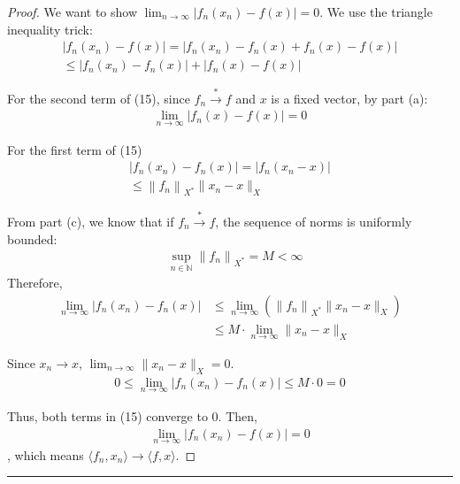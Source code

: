 \documentclass{article}
\newcommand{\norm}[1]{\left\|#1\right\|}
\begin{document}
\begin{proof}
    We want to show $\lim_{n \to \infty} |f_n(x_n) - f(x)| = 0$. We use the triangle inequality trick:
    \begin{align}
    |f_n(x_n) - f(x)| 
    = |f_n(x_n) - f_n(x) + f_n(x) - f(x)|
    \\
    \le |f_n(x_n) - f_n(x)| + |f_n(x) - f(x)|
    \end{align}

    For the second term of (15), since $f_{n} \xrightarrow{*} f$ and $x$ is a fixed vector, by part (a):
    \begin{align}
        \lim_{n \to \infty} |f_n(x) - f(x)| = 0
    \end{align}

    For the first term of (15)
    \begin{align}
        |f_n(x_n) - f_n(x)| 
        = |f_n(x_n - x)|
        \\
        \le \norm{f_n}_{X^{*}} \|x_n - x\|_X
    \end{align}
    
    From part (c), we know that if $f_{n} \xrightarrow{*} f$, the sequence of norms is uniformly bounded:
    \begin{align}
        &\sup_{n \in \mathbb{N}} \norm{f_n}_{X^{*}} = M < \infty
    \end{align}
    Therefore,
    \begin{align}
        \lim_{n \to \infty} |f_n(x_n) - f_n(x)| 
        &\le \lim_{n \to \infty} (\norm{f_n}_{X^{*}} \|x_n - x\|_X) 
        \\
        &\le M \cdot \lim_{n \to \infty} \|x_n - x\|_X
    \end{align}
    
    Since $x_{n} \to x$, $\lim_{n \to \infty} \|x_n - x\|_X = 0$.
    \begin{align}
    0 \le \lim_{n \to \infty} |f_n(x_n) - f_n(x)| \le M \cdot 0 = 0
    \end{align}

    Thus, both terms in (15) converge to 0. Then,
    \begin{align}
        \lim_{n \to \infty} |f_n(x_n) - f(x)| = 0
    \end{align}
    , which means
    $
    \langle f_{n}, x_{n} \rangle \rightarrow \langle f, x \rangle
    $.
\end{proof}


\hrule
\vspace{0.5em}

\end{document}
